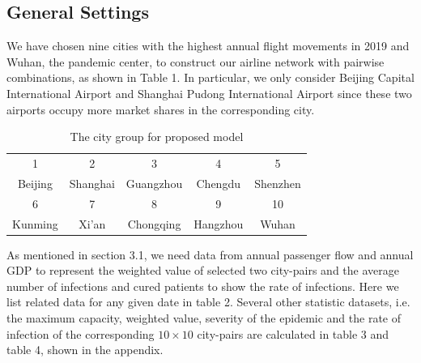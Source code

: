 \subsection{General Settings}
We have chosen nine cities with the highest annual flight movements in 2019 and Wuhan, the pandemic center, to construct our airline network with pairwise combinations, as shown in Table 1. In particular, we only consider Beijing Capital International Airport and Shanghai Pudong International Airport since these two airports occupy more market shares in the corresponding city. 
\begin{table}[H]
    \centering
    \caption{The city group for proposed model}
    \setlength{\tabcolsep}{1pt}
    \begin{tabular}{ccccc}
        \toprule
         1 & 2 & 3 & 4 & 5 \\
         Beijing & Shanghai & Guangzhou & Chengdu & Shenzhen \\
        \toprule
        6 & 7 & 8 & 9 & 10 \\
        Kunming & Xi'an & Chongqing & Hangzhou & Wuhan \\
        \bottomrule
    \end{tabular}
    \label{table1}
\end{table}
As mentioned in section 3.1, we need data from annual passenger flow and annual GDP to represent the weighted value of selected two city-pairs and the average number of infections and cured patients to show the rate of infections. Here we list related data for any given date in table 2. Several other statistic datasets, i.e. the maximum capacity, weighted value, severity of the epidemic and the rate of infection of the corresponding $10\times 10$ city-pairs are calculated in table 3 and table 4, shown in the appendix.

